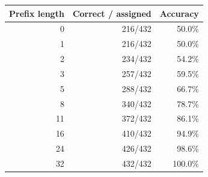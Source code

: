 \begin{tabular}{rrr}\toprule
Prefix length & Correct / assigned & Accuracy\\\midrule
0 & 216/432 & 50.0\%\\
1 & 216/432 & 50.0\%\\
2 & 234/432 & 54.2\%\\
3 & 257/432 & 59.5\%\\
5 & 288/432 & 66.7\%\\
8 & 340/432 & 78.7\%\\
11 & 372/432 & 86.1\%\\
16 & 410/432 & 94.9\%\\
24 & 426/432 & 98.6\%\\
32 & 432/432 & 100.0\%\\
\bottomrule\end{tabular}
